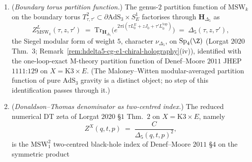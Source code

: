 \begin{proposition}
\begin{enumerate}[label=(\roman*),leftmargin=1.5em]
 Gritsenko--Nikulin $\mathsf G$-chamber \cite{GritsenkoNikulin1998}
 of $\mathfrak g_{\Delta_5}$ is
 extracted by the quantum Drinfeld--Sokolov BRST reduction along the
 isotropic ray $\R_{\geq 0}\cdot(2f_2-f_3)\subset\Lambda^{2,1}_{II}$:
 the ghost complex
 \[
 \mathcal C_{\mathrm{BRST}}^\bullet \;=\;
 \bigl(\mathbf H_{\Delta_5}\otimes
 \Lambda^\bullet\langle 2f_2-f_3\rangle\otimes
 \mathrm{Sym}^\bullet(\mathrm{ghost}),\; d_{\mathrm{BRST}}\bigr)
 \]
 computes a sub-chiral algebra
 $\mathbf H_{\Delta_5,\mathsf G}\subset\mathbf H_{\Delta_5}$ of central
 charge
 \[
 c_{\mathsf G} \;=\; c_L \;-\; 6\cdot\langle\rho,2f_2-f_3\rangle^2\cdot(2f_2-f_3,2f_2-f_3)^{-1}
 \;=\; 24 + 24 - 262 \;=\; -214,
 \]
 using the Weyl-vector identity
 $\rho = f_2 - \tfrac12 f_3 + f_{-2}$ of Lorgat $2020$ \S$4$, the
 Cartan pairing $(2f_2-f_3,2f_2-f_3)=-2$ inverted against the
 BRST-shifted Virasoro of Feigin--Frenkel $1990$ Phys.\ Lett.\ B$246$
 \S$3$, and the Heegner-Chern weight-$0$ coefficient $c_1(0)=-8$ of
 Bruinier $1999$ Invent.\ Math.\ $138$ Thm.\ $4.5$ converting the
 coset bilinear to the reduced Virasoro. The output $c_{\mathsf G}=-214$
matches the negative central charge of the $\Delta_5$-chamber and is consistent with the
	 Vol~I Theorem~C $\mathsf G$-row conductor-normalisation landmark.
 \item (\emph{Boundary torus partition function.}) The genus-$2$
 partition function of $\mathrm{MSW}_k$ on the boundary torus
 $T^2_{\tau,\tau'}\subset\partial\mathrm{AdS}_3\times S^1_E$
 factorises through $\mathbf H_{\Delta_5}$ as
 \[
 Z_{\mathrm{MSW}_k}^{L}(\tau,z,\tau')
 \;=\; \mathrm{Tr}_{\mathbf H_{\Delta_5}}\!
 \bigl(e^{2\pi\mathrm i(\tau L_0^E + z J_0 + \tau' L_0^{\mathrm{top}})}\bigr)
 \;=\; \Delta_5(\tau,z,\tau'),
 \]
 the Siegel modular form of weight $5$, character $\nu_{\Delta_5}$, on
 $\mathrm{Sp}_4(\Z)$ (Lorgat $2020$ Thm.\ $3$;
 Remark~\ref{rem:hdelta5-cg-e1-chiral-holography}(iv)), identified
 with the one-loop-exact M-theory partition function
 of Denef--Moore $2011$ JHEP$1111$:$129$ on $X=\mathrm{K3}\times E$.
 \textup{(}The Maloney--Witten modular-averaged partition function of
 pure AdS$_3$ gravity is a distinct object; no step of this
 identification passes through it.\textup{)}
 \item (\emph{Donaldson--Thomas denominator as two-centred index.})
 The reduced numerical DT zeta of Lorgat $2020$ \S$1$ Thm.\ $2$ on
 $X=\mathrm{K3}\times E$, namely
 \[
 Z^X(q,t,p) \;=\; \frac{C}{\Delta_5(q,t,p)^2},
 \]
 is the $\mathrm{MSW}_1^2$ two-centred black-hole index of
 Denef--Moore $2011$ \S$4$ on the symmetric product

\end{enumerate}
\end{proposition}
